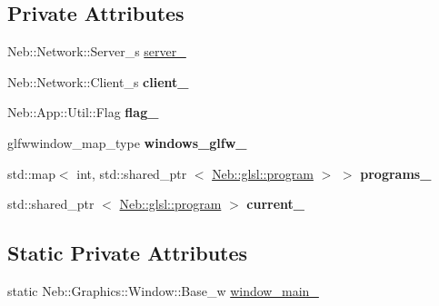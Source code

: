 \subsection*{\-Private \-Attributes}
\begin{DoxyCompactItemize}
\item 
\-Neb\-::\-Network\-::\-Server\-\_\-s \hyperlink{classNeb_1_1App_1_1Base_a347da33116990d3f31246d0d09b520bb}{server\-\_\-}
\item 
\hypertarget{classNeb_1_1App_1_1Base_a61762bbdfc8de4eda705593de4446f90}{\-Neb\-::\-Network\-::\-Client\-\_\-s {\bfseries client\-\_\-}}\label{classNeb_1_1App_1_1Base_a61762bbdfc8de4eda705593de4446f90}

\item 
\hypertarget{classNeb_1_1App_1_1Base_a1e9ceef6134c7988724583a3382c4ce9}{\-Neb\-::\-App\-::\-Util\-::\-Flag {\bfseries flag\-\_\-}}\label{classNeb_1_1App_1_1Base_a1e9ceef6134c7988724583a3382c4ce9}

\item 
\hypertarget{classNeb_1_1App_1_1Base_ada7720dc61c7709cd07495d68d686027}{glfwwindow\-\_\-map\-\_\-type {\bfseries windows\-\_\-glfw\-\_\-}}\label{classNeb_1_1App_1_1Base_ada7720dc61c7709cd07495d68d686027}

\item 
\hypertarget{classNeb_1_1App_1_1Base_a33e8d1e662c649ee561e94a9ca486ef9}{std\-::map$<$ int, std\-::shared\-\_\-ptr\*
$<$ \hyperlink{classNeb_1_1glsl_1_1program}{\-Neb\-::glsl\-::program} $>$ $>$ {\bfseries programs\-\_\-}}\label{classNeb_1_1App_1_1Base_a33e8d1e662c649ee561e94a9ca486ef9}

\item 
\hypertarget{classNeb_1_1App_1_1Base_aa754357debda8debd26b78ff8d01a97f}{std\-::shared\-\_\-ptr\*
$<$ \hyperlink{classNeb_1_1glsl_1_1program}{\-Neb\-::glsl\-::program} $>$ {\bfseries current\-\_\-}}\label{classNeb_1_1App_1_1Base_aa754357debda8debd26b78ff8d01a97f}

\end{DoxyCompactItemize}
\subsection*{\-Static \-Private \-Attributes}
\begin{DoxyCompactItemize}
\item 
static \*
\-Neb\-::\-Graphics\-::\-Window\-::\-Base\-\_\-w \hyperlink{classNeb_1_1App_1_1Base_a4a6527469072e5d1f01f76215b6b2fd3}{window\-\_\-main\-\_\-}
\end{DoxyCompactItemize}


